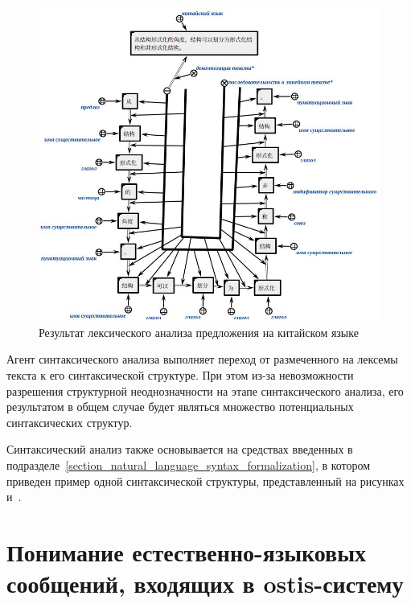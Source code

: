 {\begin{figure}[H]
	\centering
	\includegraphics[scale=0.6]{images/part4/chapter_chinese/segment_chinese_sentence}
	\caption{Результат лексического анализа предложения на китайском языке}
	\label{fig:segment-chinese}
\end{figure}

Агент синтаксического анализа выполняет переход от размеченного на лексемы текста к его синтаксической структуре.
При этом из-за невозможности разрешения структурной неоднозначности на этапе синтаксического анализа, его результатом в общем случае будет являться множество потенциальных синтаксических структур.

Синтаксический анализ также основывается на средствах введенных в подразделе~\ref{section_natural_language_syntax_formalization}, в котором приведен пример одной синтаксической структуры, представленный на рисунках~\textit{} и~\textit{}.

\section{Понимание естественно-языковых сообщений, входящих в ostis-систему}
\label{section_natural_language_messages_understanding}

\begin{SCn}


\end{SCn}}
